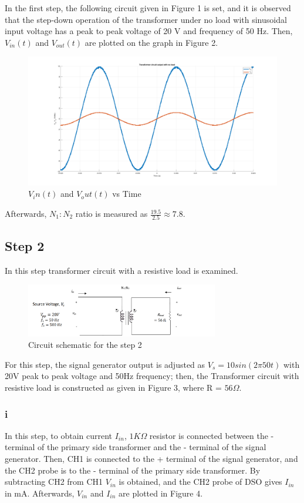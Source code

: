 \documentclass[letterpaper,12pt]{article}
\begin{document}
In the first step, the following circuit given in Figure 1 is set, and it is observed that the step-down operation of the transformer under no load with sinusoidal input voltage has a peak to peak voltage of 20 V and frequency of 50 Hz. Then, \(V_{in}(t) \) and \(V_{out}(t)\) are plotted on the graph in Figure 2.
\begin{figure}[H]
    \centering
    \includegraphics[width = 1\textwidth]{1_1.png}
    \caption{\(V_in(t) \) and \(V_out(t)\) vs Time}
\end{figure} 
Afterwards, \(N_1:N_2\) ratio is measured as \(\frac{19.5}{2.5}\approx 7.8 \).

%

%
\subsection{Step 2}
In this step transformer circuit with a resistive load is examined.
\begin{figure}[H]
    \centering
    \includegraphics[width = 0.75\textwidth]{2.png}
    \caption{Circuit schematic for the step 2}
\end{figure} 


For this step, the signal generator output is adjusted as \(V_s = 10sin(2\pi50t)\) with 20V peak to peak voltage and 50Hz frequency; then, the Transformer circuit with resistive load is constructed as given in Figure 3, where R = \(56\Omega \).  
\subsubsection{i}
In this step, to obtain current \(I_{in}\), \(1K\Omega \) resistor is connected between the - terminal of the primary side transformer and the - terminal of the signal generator. Then, CH1 is connected to the + terminal of the signal generator, and the CH2 probe is to the - terminal of the primary side transformer. By subtracting CH2 from CH1 \(V_{in}\) is obtained, and the CH2 probe of DSO gives \(I_{in}\) in mA. Afterwards, \(V_{in}\) and \(I_{in}\) are plotted in Figure 4. 
\end{document}
